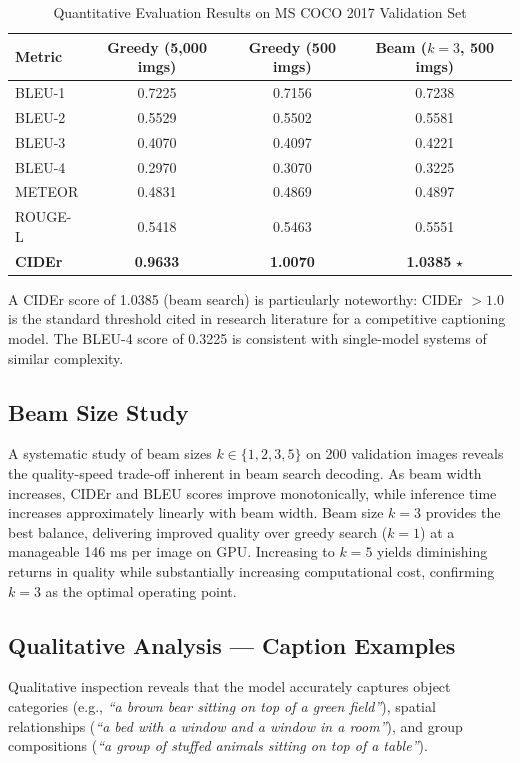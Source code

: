 \documentclass[conference]{IEEEtran}
\begin{document}
\begin{table}[htbp]
\caption{Quantitative Evaluation Results on MS COCO 2017 Validation Set}
\label{tab:eval_metrics}
\centering
\small
\begin{tabular}{@{}lccc@{}}
\toprule
\textbf{Metric} & \textbf{Greedy (5,000 imgs)} & \textbf{Greedy (500 imgs)} & \textbf{Beam ($k=3$, 500 imgs)} \\
\midrule
BLEU-1 & 0.7225 & 0.7156 & 0.7238 \\
BLEU-2 & 0.5529 & 0.5502 & 0.5581 \\
BLEU-3 & 0.4070 & 0.4097 & 0.4221 \\
BLEU-4 & 0.2970 & 0.3070 & 0.3225 \\
METEOR & 0.4831 & 0.4869 & 0.4897 \\
ROUGE-L & 0.5418 & 0.5463 & 0.5551 \\
\textbf{CIDEr} & \textbf{0.9633} & \textbf{1.0070} & \textbf{1.0385} $\star$ \\
\bottomrule
\end{tabular}
\end{table}

A CIDEr score of 1.0385 (beam search) is particularly noteworthy: CIDEr $> 1.0$ is the standard threshold cited in research literature for a competitive captioning model. The BLEU-4 score of 0.3225 is consistent with single-model systems of similar complexity.

\subsection{Beam Size Study}
A systematic study of beam sizes $k \in \{1, 2, 3, 5\}$ on 200 validation images reveals the quality-speed trade-off inherent in beam search decoding. As beam width increases, CIDEr and BLEU scores improve monotonically, while inference time increases approximately linearly with beam width. Beam size $k=3$ provides the best balance, delivering improved quality over greedy search ($k=1$) at a manageable 146 ms per image on GPU. Increasing to $k=5$ yields diminishing returns in quality while substantially increasing computational cost, confirming $k=3$ as the optimal operating point.

\subsection{Qualitative Analysis --- Caption Examples}
Qualitative inspection reveals that the model accurately captures object categories (e.g., \textit{``a brown bear sitting on top of a green field''}), spatial relationships (\textit{``a bed with a window and a window in a room''}), and group compositions (\textit{``a group of stuffed animals sitting on top of a table''}).
\end{document}

